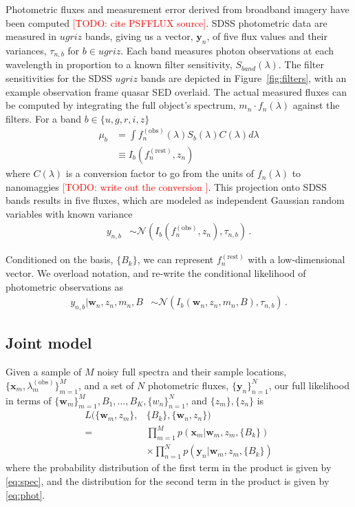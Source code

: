 \documentclass{article}
\newcommand{\red}[1]{\textcolor{red}{[TODO: #1]}}
\begin{document}
Photometric fluxes and measurement error derived from broadband imagery have been computed \red{cite PSFFLUX source}. 
SDSS photometric data are measured in $ugriz$ bands, giving us a vector, $\mathbf{y}_n$, of five flux values and their variances, $\tau_{n, b}$ for $b \in ugriz$. 
Each band measures photon observations at each wavelength in proportion to a known filter sensitivity, $S_{band}(\lambda)$. 
The filter sensitivities for the SDSS $ugriz$ bands are depicted in Figure~\ref{fig:filters}, with an example observation frame quasar SED overlaid.  The actual measured fluxes can be computed by integrating the full object's spectrum, $m_n \cdot f_n(\lambda)$ against the filters.  For a band $b \in \{u, g, r, i, z \}$
\begin{align}
  \mu_b &= \int f^{(\text{obs})}_n(\lambda) S_b(\lambda) C(\lambda) d \lambda  \\
        &\equiv I_b(f_n^{(\text{rest})}, z_n)
\end{align}
where $C(\lambda)$ is a conversion factor to go from the units of $f_n(\lambda)$ to nanomaggies \red{ write out the conversion }.  This projection onto SDSS bands results in five fluxes, which are modeled as independent Gaussian random variables with known variance
\begin{align}
  y_{n,b} &\sim \mathcal{N}( I_b(f_n^{(\text{obs})}, z_n), \tau_{n,b} ) \, .
\end{align}

Conditioned on the basis, $\{B_k\}$, we can represent $f_n^{(\text{rest})}$ with a low-dimensional vector.  We overload notation, and re-write the conditional likelihood of photometric observations as
\begin{align}
    y_{n,b} | \mathbf{w}_n, z_n, m_n, B &\sim \mathcal{N}( I_b(\mathbf{w}_n, z_n, m_n, B), \tau_{n,b} ) \, .
   \label{eq:phot}
\end{align}

\subsection{Joint model}
Given a sample of $M$ noisy full spectra and their sample locations, $\{\mathbf{x}_m, \lambda^{(\text{obs})}_m \}_{m=1}^M$, and a set of $N$ photometric fluxes, $\{\mathbf{y}_n\}_{n=1}^N$, our full likelihood in terms of $\{ \mathbf{w}_m \}_{m=1}^M, B_1, \dots, B_K, \{ w_n \}_{n=1}^N$, and $\{z_m\}, \{z_n\}$ is 
\begin{align*}
  L( \{ \mathbf{w}_m, z_m \}, &\{ B_k \}, \{ \mathbf{w}_n, z_n \} )  \\
    = & \prod_{m=1}^M p( \mathbf{x}_m | \mathbf{w}_m, z_m, \{ B_k \})  \\
      & \times \prod_{n=1}^N p( \mathbf{y}_n | \mathbf{w}_m, z_m, \{ B_k \})
\end{align*}
where the probability distribution of the first term in the product is given by \ref{eq:spec}, and the distribution for the second term in the product is given by \ref{eq:phot}.  
\end{document}
